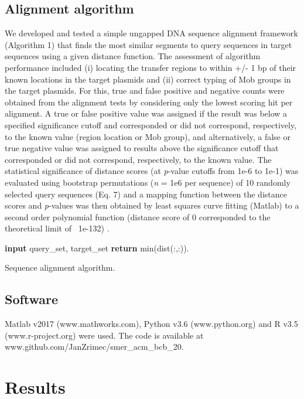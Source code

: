 \documentclass[sigconf]{acmart}
\begin{document}
\subsection{Alignment algorithm}
We developed and tested a simple ungapped DNA sequence alignment framework (Algorithm 1) that finds the most similar segments to query sequences in target sequences using a given distance function. The assessment of algorithm performance included (i) locating the transfer regions to within +/- 1 bp of their known locations in the target plasmids and (ii) correct typing of Mob groups in the target plasmids. For this, true and false positive and negative counts were obtained from the alignment tests by considering only the lowest scoring hit per alignment. A true or false positive value was assigned if the result was below a specified significance cutoff and corresponded or did not correspond, respectively, to the known value (region location or Mob group), and alternatively, a false or true negative value was assigned to results above the significance cutoff that corresponded or did not correspond, respectively, to the known value. The statistical significance of distance scores (at \textit{p}-value cutoffs from 1e-6 to 1e-1) was evaluated using bootstrap permutations (\textit{n} = 1e6 per sequence) of 10 randomly selected query sequences (Eq. 7) and a mapping function between the distance scores and \textit{p}-values was then obtained by least squares curve fitting (Matlab) to a second order polynomial function (distance score of 0 corresponded to the theoretical limit of ~1e-132) \cite{Zrimec2020-wx}. 

\begin{algorithm}
\SetAlgoLined
 \textbf{input} query\_set, target\_set\;
 \textbf{return} min(dist(:,:)).
 \caption{Sequence alignment algorithm.}
\end{algorithm}

\subsection{Software}
Matlab v2017 (www.mathworks.com), Python v3.6 (www.python.org) and R v3.5 (www.r-project.org) were used. The code is available at www.github.com/JanZrimec/smer\_acm\_bcb\_20.


\section{Results}
\end{document}
